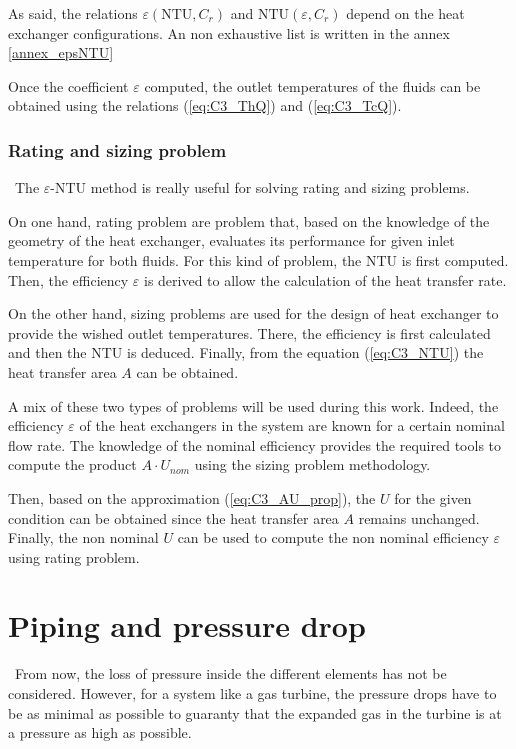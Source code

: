 As said, the relations $\varepsilon(\text{NTU},C_r)$ and $\text{NTU}(\varepsilon,C_r)$ depend on the heat exchanger configurations. An non exhaustive list is written in the annex \ref{annex_epsNTU}\citep{GregoryNellis2015} 

Once the coefficient $\varepsilon$ computed, the outlet temperatures of the fluids can be obtained using the relations (\ref{eq:C3_ThQ}) and (\ref{eq:C3_TcQ}).

\subsubsection{Rating and sizing problem}
\quad\, The $\varepsilon$-NTU method is really useful for solving rating and sizing problems.

On one hand, rating problem are problem that, based on the knowledge of the geometry of the heat exchanger, evaluates its performance for given inlet temperature for both fluids. For this kind of problem, the NTU is first computed. Then, the efficiency $\varepsilon$ is derived to allow the calculation of the heat transfer rate.

On the other hand, sizing problems are used for the design of heat exchanger to provide the wished outlet temperatures. There, the efficiency is first calculated and then the NTU is deduced. Finally, from the equation (\ref{eq:C3_NTU}) the heat transfer area $A$ can be obtained\citep{Ngendakumana2018}.

A mix of these two types of problems will be used during this work. Indeed, the efficiency $\varepsilon$ of the heat exchangers in the system are known for a certain nominal flow rate.    The knowledge of the nominal efficiency provides the required tools to compute the product $A\cdot U_{nom}$ using the sizing problem methodology. 

Then, based on the approximation (\ref{eq:C3_AU_prop}), the $U$ for the given condition can be obtained since the heat transfer area $A$ remains unchanged. Finally, the non nominal $U$ can be used to compute the non nominal efficiency $\varepsilon$ using rating problem.

\section{Piping and pressure drop}
\quad\, From now, the loss of pressure inside the different elements has not be considered. However, for a system like a gas turbine, the pressure drops have to be as minimal as possible to guaranty that the expanded gas in the turbine is at a pressure as high as possible. 

